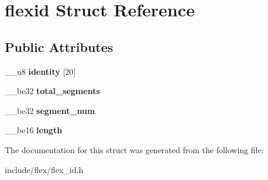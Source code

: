 \hypertarget{structflexid}{}\section{flexid Struct Reference}
\label{structflexid}
\subsection*{Public Attributes}
\begin{DoxyCompactItemize}
\item 
\+\_\+\+\_\+u8 {\bfseries identity} \mbox{[}20\mbox{]}\hypertarget{structflexid_ab9e1df37109f8620f2be93955de9cb97}{}\label{structflexid_ab9e1df37109f8620f2be93955de9cb97}

\item 
\+\_\+\+\_\+be32 {\bfseries total\+\_\+segments}\hypertarget{structflexid_a06122ad6fde6feb1e4edba60f476640e}{}\label{structflexid_a06122ad6fde6feb1e4edba60f476640e}

\item 
\+\_\+\+\_\+be32 {\bfseries segment\+\_\+num}\hypertarget{structflexid_ae502fa12b4cd189628452ca8c6fd0dc0}{}\label{structflexid_ae502fa12b4cd189628452ca8c6fd0dc0}

\item 
\+\_\+\+\_\+be16 {\bfseries length}\hypertarget{structflexid_a652f4ff1a68f65a499f877337d4d7460}{}\label{structflexid_a652f4ff1a68f65a499f877337d4d7460}

\end{DoxyCompactItemize}


The documentation for this struct was generated from the following file\+:\begin{DoxyCompactItemize}
\item 
include/flex/flex\+\_\+id.\+h\end{DoxyCompactItemize}
